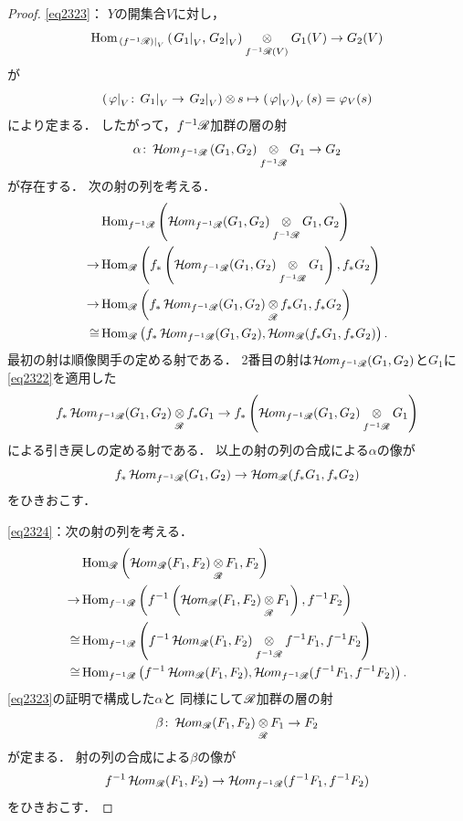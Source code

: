 \begin{proof}
    \eqref{eq2323}：
    \(Y\)の開集合\(V\)に対し，\[
        \Hom_{\mres[(f^{-1}\scR)]{V}}\left(\mres[G_1]{V},\mres[G_2]{V}\right)\ttens[f^{-1}\scR(V)]G_1(V)\to G_2(V)
    \]が\[
        \left(
            \mres[\varphi]{V}\colon \mres[G_1]{V}\to\mres[G_2]{V}
        \right)\tens[]s
        \mapsto
        \left(\mres[\varphi]{V}\right)_{V}(s)=\varphi_V(s)
    \]により定まる．
    したがって，\(f^{-1}\mathscr{R}\)加群の層の射\[
        \alpha\colon\HOM_{f^{-1}\scR}\left(G_1,G_2\right)\ttens[f^{-1}\scR]G_1\to G_2
    \]が存在する．
    次の射の列を考える．
    \begin{align*}
        &\Hom_{f^{-1}\scR}\left(
            \HOM_{f^{-1}\scR}(G_1,G_2)\ttens[f^{-1}\scR]G_1, 
            G_2
        \right)\\
        \to&
        \Hom_{\scR}\left(
            f_{\ast}\left(
                \HOM_{f^{-1}\scR}(G_1,G_2)\ttens[f^{-1}\scR]G_1
            \right), 
            f_{\ast}G_2
        \right)\\
        \to&
        \Hom_{\scR}\left(
            f_{\ast}\HOM_{f^{-1}\scR}(G_1,G_2)\ttens[\scR]f_{\ast}G_1, 
            f_{\ast}G_2
        \right)\\
        \cong&
        \Hom_{\scR}\left(
            f_{\ast}\HOM_{f^{-1}\scR}(G_1,G_2), 
            \HOM_{\scR}(f_{\ast}G_1,f_{\ast}G_2)
        \right).
    \end{align*}
    最初の射は順像関手の定める射である．
    2番目の射は\(\mathop{\mathcal{H}\hspace{-0.5pt}om}\nolimits_{f^{-1}\mathscr{R}}(G_1,G_2)\)と\(G_1\)に
    \eqref{eq2322}を適用した\[
        f_{\ast}
        \HOM_{f^{-1}\scR}(G_1,G_2)\ttens[\scR]f_{\ast}G_1
        \to
        f_{\ast}\left(
                \HOM_{f^{-1}\scR}(G_1,G_2)\ttens[f^{-1}\scR]G_1
            \right)
    \]による引き戻しの定める射である．
    以上の射の列の合成による\(\alpha\)の像が\[
        f_{\ast}\mathop{\mathcal{H}\hspace{-0.5pt}om}\nolimits_{f^{-1}\mathscr{R}}(G_1,G_2)\to 
        \mathop{\mathcal{H}\hspace{-0.5pt}om}\nolimits_{\mathscr{R}}(f_{\ast}G_1,f_{\ast}G_2)
    \]をひきおこす．

    \eqref{eq2324}：次の射の列を考える．
    \begin{align*}
        &\Hom_{\scR}\left(
            \HOM_{\scR}(F_1,F_2)\ttens[\scR]F_1,F_2
        \right)\\
        \to&
        \Hom_{f^{-1}\scR}\left(
            f^{-1}\left(
                \HOM_{\scR}(F_1,F_2)\ttens[\scR]F_1
            \right),f^{-1}F_2
        \right)\\
        \cong&
        \Hom_{f^{-1}\scR}\left(
            f^{-1}\HOM_{\scR}(F_1,F_2)
            \ttens[f^{-1}\scR]f^{-1}F_1
            ,f^{-1}F_2
        \right)\\
        \cong&
        \Hom_{f^{-1}\scR}\left(
            f^{-1}\HOM_{\scR}(F_1,F_2)
            ,\HOM_{f^{-1}\scR}(f^{-1}F_1
            ,f^{-1}F_2)
        \right).
    \end{align*}
    \eqref{eq2323}の証明で構成した\(\alpha\)と
    同様にして\(\mathscr{R}\)加群の層の射\[
        \beta\colon \HOM_{\scR}(F_1,F_2)\ttens[\scR]F_1\to F_2
    \]が定まる．
    射の列の合成による\(\beta\)の像が\[
        f^{-1}\mathop{\mathcal{H}\hspace{-0.5pt}om}\nolimits_{\mathscr{R}}(F_1,F_2)
        \to
        \mathop{\mathcal{H}\hspace{-0.5pt}om}\nolimits_{f^{-1}\mathscr{R}}(f^{-1}F_1,f^{-1}F_2)
    \]をひきおこす．
\end{proof}

